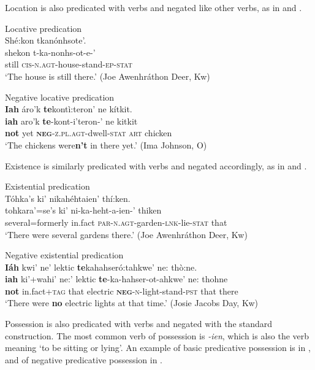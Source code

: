 \documentclass[output=paper,colorlinks,citecolor=brown]{langscibook}
\begin{document}
Location is also predicated with verbs and negated like other verbs, as in  and .

\ea\label{ex:moh:43}Locative predication\\
    \glll Shé:kon tkanónhsote’.\\
         shekon t-ka-nonhs-ot-e-’\\
         still \textsc{cis-n.agt}-house-stand-\textsc{ep-stat}\\
    \glt ‘The house is still there.’ (Joe Awenhráthon Deer, Kw)
\z

\ea\label{ex:moh:44}Negative locative predication\\
    \glll \textbf{Iah} áro’k \textbf{te}kontì:teron’ ne kítkit. \\
         \textbf{iah} aro’k \textbf{te}-kont-i’teron-’ ne kitkit\\
         \textbf{not} yet \textbf{\textsc{neg}}\textsc{-z.pl.agt}-dwell-\textsc{stat} \textsc{art} chicken \\
    \glt ‘The chickens were\textbf{n’t} in there yet.’ (Ima Johnson, O)
\z

Existence is similarly predicated with verbs and negated accordingly, as in  and .

\ea\label{ex:moh:45}Existential predication\\
    \glll Tóhka’s ki’ nikahéhtaien’ thí:ken. \\
         tohkara’=se’s ki’ ni-ka-heht-a-ien-’ thiken\\
         several=formerly in.fact \textsc{par-n.agt}-garden-\textsc{lnk-}lie-\textsc{stat} that\\
    \glt ‘There were several gardens there.’ (Joe Awenhráthon Deer, Kw)
\z

\ea\label{ex:moh:46}Negative existential predication\\
    \glll \textbf{Iáh} kwi’ ne’ lektic \textbf{te}kahahseró:tahkwe’ ne: thò:ne.\\
         \textbf{iah} ki’+wahi’ ne:’ {lektic} \textbf{te}-ka-hahser-ot-ahkwe’ ne: thohne\\
         \textbf{not} in.fact+\textsc{tag} that {electric} \textbf{\textsc{neg}}\textsc{-n}-light-stand-\textsc{pst} that there\\
    \glt ‘There were \textbf{no} electric lights at that time.’ (Josie Jacobs Day, Kw)
\z

Possession is also predicated with verbs and negated with the standard construction. The most common verb of possession is \textit{{}-ien}, which is also the verb meaning ‘to be sitting or lying’. An example of basic predicative possession is in , and of negative predicative possession in .
\end{document}
